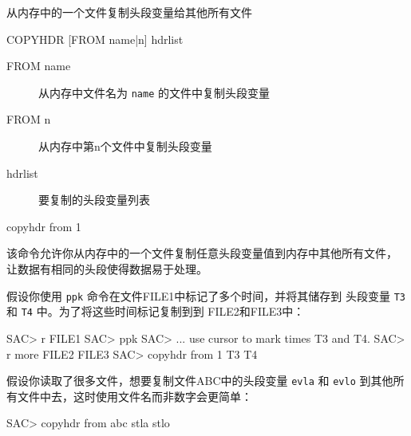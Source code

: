 \label{cmd:copyhdr}

从内存中的一个文件复制头段变量给其他所有文件

\begin{SACSTX}
COPYHDR [FROM name|n] hdrlist
\end{SACSTX}

\begin{description}
\item [FROM name] 从内存中文件名为 \texttt{name} 的文件中复制头段变量
\item [FROM n] 从内存中第n个文件中复制头段变量
\item [hdrlist] 要复制的头段变量列表
\end{description}

\begin{SACDFT}
copyhdr from 1
\end{SACDFT}

该命令允许你从内存中的一个文件复制任意头段变量值到内存中其他所有文件，
让数据有相同的头段使得数据易于处理。

假设你使用 \texttt{ppk} 命令在文件FILE1中标记了多个时间，并将其储存到
头段变量 \texttt{T3} 和 \texttt{T4} 中。为了将这些时间标记复制到到
FILE2和FILE3中：
\begin{SACCode}
SAC> r FILE1
SAC> ppk
SAC> ... use cursor to mark times T3 and T4.
SAC> r more FILE2 FILE3
SAC> copyhdr from 1 T3 T4
\end{SACCode}

假设你读取了很多文件，想要复制文件ABC中的头段变量 \texttt{evla} 和
\texttt{evlo} 到其他所有文件中去，这时使用文件名而非数字会更简单：
\begin{SACCode}
SAC> copyhdr from abc stla stlo
\end{SACCode}
